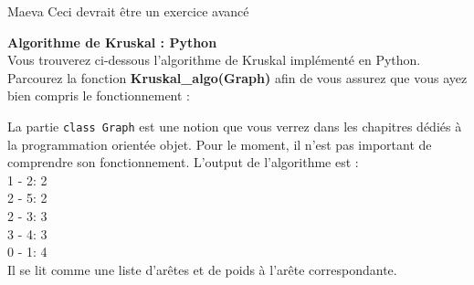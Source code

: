 \begin{note}{Maeva}
    Ceci devrait être un exercice avancé
\end{note}

\begin{Exercice}[15 minutes] \textbf{Algorithme de Kruskal : Python}\\
    Vous trouverez ci-dessous l'algorithme de Kruskal implémenté en Python. Parcourez la fonction \textbf{Kruskal\_algo(Graph)} afin de vous assurez que vous ayez bien compris le fonctionnement :\\
    
    \begin{conseil}
        La partie \lstinline{class Graph} est une notion que vous verrez dans les chapitres dédiés à la programmation orientée objet. Pour le moment, il n'est pas important de comprendre son fonctionnement. L'output de l'algorithme est : \\
        1 - 2: 2\\
        2 - 5: 2\\
        2 - 3: 3\\
        3 - 4: 3\\
        0 - 1: 4\\
        Il se lit comme une liste d'arêtes et de poids à l'arête correspondante.
    \end{conseil}
\end{Exercice}

\newpage

